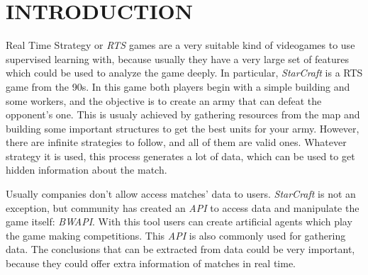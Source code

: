 \documentclass[a4paper,twoside]{article}\usepackage[]{graphicx}\usepackage[]{color}
\begin{document}





\onecolumn \maketitle \normalsize \vfill



\section{\uppercase{Introduction}}
\label{sec:introduction}

%
%

\noindent Real Time Strategy or \emph{RTS} games are a very suitable kind of videogames
to use supervised learning with, because usually they have a very large set of
features which could be used to analyze the game deeply. In particular,
\emph{StarCraft} is a RTS game from the 90s. In this game both
players begin with a simple building and some workers, and the objective is
to create an army that can defeat the opponent's one. This is usualy achieved
by gathering resources from the map and building some important structures to get
the best units for your army. However, there are infinite strategies to follow,
and all of them are valid ones. Whatever strategy it is used, this process
generates a lot of data, which can be used to get hidden information about the
match.


Usually companies don't allow access matches' data to users. \emph{StarCraft}
is not an exception, but community has created an \emph{API} to access data
and manipulate the game itself: \emph{BWAPI}. With this tool users can create
artificial agents which play the game making competitions. This \emph{API} is
also commonly used for gathering data. The conclusions that can be extracted
from data could be very important, because they could offer extra information
of matches in real time.
\end{document}
